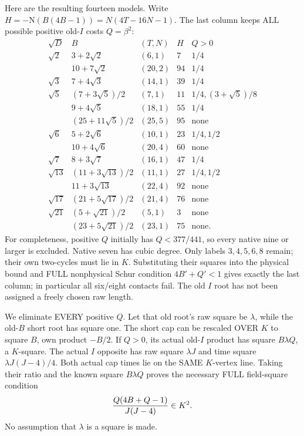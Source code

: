 \documentclass[11pt]{article}
\begin{document}
Here are the resulting fourteen models.
Write \(H=-\mathrm N(B(4B-1))
=N(4T-16N-1)\).
The last column keeps ALL possible
positive old-\(I\) costs \(Q=\beta^2\):
\[
\begin{array}{c|c|c|r|l}
 \sqrt D&B&(T,N)&H&Q>0\\ \hline
 \sqrt2&3+2\sqrt2&(6,1)&7&1/4\\
 &10+7\sqrt2&(20,2)&94&1/4\\
 \sqrt3&7+4\sqrt3&(14,1)&39&1/4\\
 \sqrt5&(7+3\sqrt5)/2&(7,1)&11&1/4,(3+\sqrt5)/8\\
 &9+4\sqrt5&(18,1)&55&1/4\\
 &(25+11\sqrt5)/2&(25,5)&95&\text{none}\\
 \sqrt6&5+2\sqrt6&(10,1)&23&1/4,1/2\\
 &10+4\sqrt6&(20,4)&60&\text{none}\\
 \sqrt7&8+3\sqrt7&(16,1)&47&1/4\\
 \sqrt{13}&(11+3\sqrt{13})/2&(11,1)&27&1/4,1/2\\
 &11+3\sqrt{13}&(22,4)&92&\text{none}\\
 \sqrt{17}&(21+5\sqrt{17})/2&(21,4)&76&\text{none}\\
 \sqrt{21}&(5+\sqrt{21})/2&(5,1)&3&\text{none}\\
 &(23+5\sqrt{21})/2&(23,1)&75&\text{none}.
\end{array}
\]
For completeness, positive \(Q\) initially
has \(Q<377/441\), so every native nine
or larger is excluded.
Native seven has cubic degree.
Only labels \(3,4,5,6,8\) remain;
their own two-cycles must lie in \(K\).
Substituting their squares into the
physical bound and FULL nonphysical
Schur condition \(4B'+Q'<1\) gives
exactly the last column; in particular
all six/eight contacts fail.
The old \(I\) root has not been assigned
a freely chosen raw length.

We eliminate EVERY positive \(Q\).
Let that old root's raw square be
\(\lambda\), while the old-\(B\) short
root has square one.
The short cap can be rescaled OVER \(K\)
to square \(B\), own product \(-B/2\).
If \(Q>0\), its actual old-\(I\) product
has square \(B\lambda Q\), a \(K\)-square.
The actual \(I\) opposite has raw square
\(\lambda J\) and time square
\(\lambda J(J-4)/4\).
Both actual cap times lie on the SAME
\(K\)-vertex line.
Taking their ratio and the known square
\(B\lambda Q\) proves the necessary
FULL field-square condition
\[
                          {Q(4B+Q-1)\over J(J-4)}\in K^2 .
\]
No assumption that \(\lambda\) is a
square is made.
\end{document}

